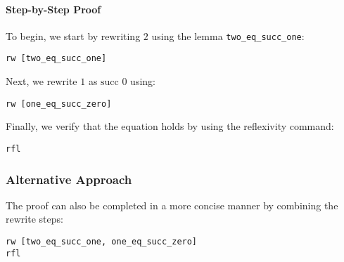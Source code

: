 \documentclass{article}
\begin{document}
\paragraph{Step-by-Step Proof}
To begin, we start by rewriting \( 2 \) using the lemma \texttt{two\_eq\_succ\_one}:
\begin{verbatim}
rw [two_eq_succ_one]
\end{verbatim}

Next, we rewrite \( 1 \) as \( \text{succ } 0 \) using:
\begin{verbatim}
rw [one_eq_succ_zero]
\end{verbatim}

Finally, we verify that the equation holds by using the reflexivity command:
\begin{verbatim}
rfl
\end{verbatim}

\subsubsection{Alternative Approach}
The proof can also be completed in a more concise manner by combining the rewrite steps:
\begin{verbatim}
rw [two_eq_succ_one, one_eq_succ_zero]
rfl
\end{verbatim}
\end{document}

